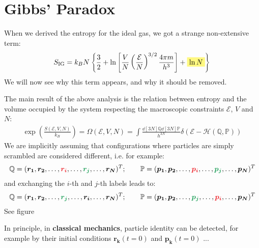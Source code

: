 \documentclass[../../main.tex]{subfiles}
\begin{document}

\section{Gibbs' Paradox}

When we derived the entropy for the ideal gas, we got a strange non-extensive term:
\begin{align}
    S_{\mathrm{IG}} = k_B N \left\{\frac{3}{2} + \ln\left[\frac{V}{N} \left(\frac{\mathcal{E}}{N} \right)^{3/2} \frac{4 \pi m}{h^3}  \right] + \hlc{Yellow}{\ln N} \right\} \label{eqn:78}
\end{align}
We will now see why this term appears, and why it should be removed.

\medskip

The main result of the above analysis is the relation between entropy and the volume occupied by the system respecting the macroscopic constraints $\mathcal{E}$, $V$ and $N$:
\begin{align}\label{eqn:75}
    \exp\left(\frac{S(\mathcal{E}, V, N)}{k_B} \right) = \Omega(\mathcal{E}, V, N) = \int \frac{\dd[3N]{\mathbb{Q}} \dd[3N]{\mathbb{P}}}{h^{3N}} \delta(\mathcal{E}- \mathcal{H}(\mathbb{Q},\mathbb{P})) 
\end{align}
We are implicitly assuming that configurations where particles are simply scrambled are considered different, i.e. for example:
\begin{align*}
    \mathbb{Q}=(\bm{r_1}, \bm{r_2}, \dots, \textcolor{Red}{\bm{r_i}}, \dots, \textcolor{ForestGreen}{\bm{r_j}}, \dots, \bm{r_N})^T; \qquad \mathbb{P}=(\bm{p_1}, \bm{p_2}, \dots, \textcolor{Red}{\bm{p_i}}, \dots, \textcolor{ForestGreen}{\bm{p_j}}, \dots, \bm{p_N})^T
\end{align*}
and exchanging the $i$-th and $j$-th labels leads to:
\begin{align*}
    \mathbb{Q}=(\bm{r_1}, \bm{r_2}, \dots, \textcolor{ForestGreen}{\bm{r_j}} \textcolor{Red}{}, \dots,\bm{r_i}, \dots, \bm{r_N})^T; \qquad \mathbb{P}=(\bm{p_1}, \bm{p_2}, \dots,\textcolor{ForestGreen}{\bm{p_j}} , \dots,\textcolor{Red}{\bm{p_i}} , \dots, \bm{p_N})^T
\end{align*}
See figure %

\medskip

In principle, in \textbf{classical mechanics}, particle identity can be detected, for example by their initial conditions $\bm{r_k}(t=0)$ and $\bm{p_k}(t=0)$ ...
\end{document}

